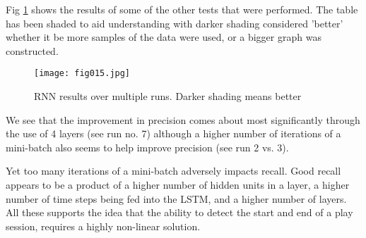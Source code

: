 Fig \ref{fig15} shows the results of some of the other tests that were performed. The table has been shaded to aid understanding with darker shading considered 'better' whether it be more samples of the data were used, or a bigger graph was constructed.

\begin{figure}[h!]
	\centering
	\texttt{[image: fig015.jpg]}
	\caption{RNN results over multiple runs. Darker shading means better}
	\label{fig15}
\end{figure}

We see that the improvement in precision comes about most significantly through the use of 4 layers (see run no. 7) although a higher number of iterations of a mini-batch also seems to help improve precision (see run 2 vs. 3). 

Yet too many iterations of a mini-batch adversely impacts recall. Good recall appears to be a product of a higher number of hidden units in a layer, a higher number of time steps being fed into the LSTM, and a higher number of layers. All these supports the idea that the ability to detect the start and end of a play session, requires a highly non-linear solution.